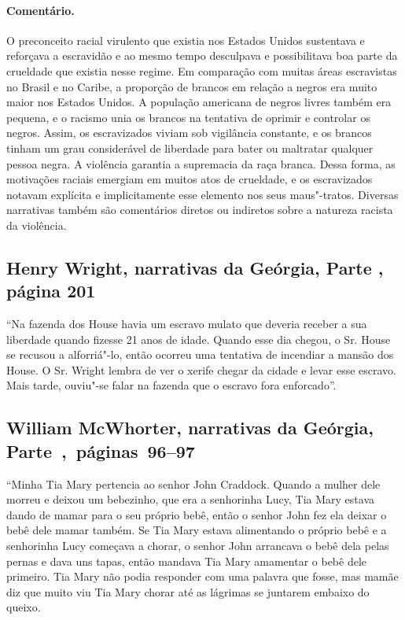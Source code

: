 \paragraph{Comentário.}\quad
{\small
O preconceito racial virulento que existia nos Estados Unidos
sustentava e reforçava a escravidão e ao mesmo tempo desculpava e
possibilitava boa parte da crueldade que existia nesse regime. Em
comparação com muitas áreas escravistas no Brasil e no Caribe, a
proporção de brancos em relação a negros era muito maior nos Estados
Unidos. A população americana de negros livres também era pequena, e o
racismo unia os brancos na tentativa de oprimir e controlar os negros.
Assim, os escravizados viviam sob vigilância constante, e os brancos tinham
um grau considerável de liberdade para bater ou maltratar qualquer
pessoa negra. A violência garantia a supremacia da raça branca. Dessa
forma, as motivações raciais emergiam em muitos atos de crueldade, e os
escravizados notavam explícita e implicitamente esse elemento nos seus
maus"-tratos. Diversas narrativas também são comentários diretos ou
indiretos sobre a natureza racista da violência.
}

\subsection{Henry Wright, narrativas da Geórgia, Parte , página 201}
\label{ref318}

``Na fazenda dos House havia um escravo mulato que deveria receber a sua
liberdade quando fizesse 21 anos de idade. Quando esse dia chegou, o Sr.
House se recusou a alforriá"-lo, então ocorreu uma tentativa de incendiar
a mansão dos House. O Sr. Wright lembra de ver o xerife chegar da cidade
e levar esse escravo. Mais tarde, ouviu"-se falar na fazenda que o
escravo fora enforcado''.

\subsection{William McWhorter, narrativas da Geórgia, Parte~,~páginas~96--97}
\label{ref189}

``Minha Tia Mary pertencia ao senhor John Craddock. Quando a mulher dele
morreu e deixou um bebezinho, que era a senhorinha Lucy, Tia Mary estava
dando de mamar para o seu próprio bebê, então o senhor John fez ela
deixar o bebê dele mamar também. Se Tia Mary estava alimentando o
próprio bebê e a senhorinha Lucy começava a chorar, o senhor John
arrancava o bebê dela pelas pernas e dava uns tapas, então mandava Tia
Mary amamentar o bebê dele primeiro. Tia Mary não podia responder com
uma palavra que fosse, mas mamãe diz que muito viu Tia Mary chorar até
as lágrimas se juntarem embaixo do queixo.


